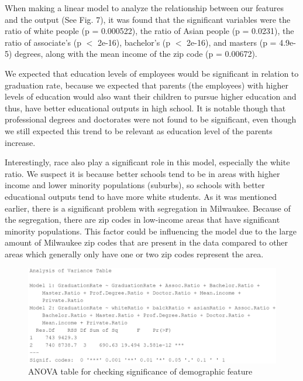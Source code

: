 \documentclass[letterpaper, 10 pt, conference]{ieeeconf}  %
\begin{document}
When making a linear model to analyze the relationship between our features and the output (See Fig. 7), it was found that the significant variables were the ratio of white people (p = 0.000522), the ratio of Asian people (p = 0.0231), the ratio of associate's (p $<$ 2e-16), bachelor's (p $<$ 2e-16), and masters (p = 4.9e-5) degrees, along with the mean income of the zip code (p = 0.00672). 

We expected that education levels of employees would be significant in relation to graduation rate, because we expected that parents (the employees) with higher levels of education would also want their children to pursue higher education and thus, have better educational outputs in high school. 
It is notable though that professional degrees and doctorates were not found to be significant, even though we still expected this trend to be relevant as education level of the parents increase. 

Interestingly, race also play a significant role in this model, especially the white ratio.
We suspect it is because better schools tend to be in areas with higher income and lower minority populations (suburbs), so schools with better educational outputs tend to have more white students.
As it was mentioned earlier, there is a significant problem with segregation in Milwaukee. Because of the segregation, there are zip codes in low-income areas that have significant minority populations. 
This factor could be influencing the model due to the large amount of Milwaukee zip codes that are present in the data compared to other areas which generally only have one or two zip codes represent the area. 

\begin{figure}[h]
\begin{center}
\includegraphics[width=1.0\linewidth]{ANOVA_Grad.PNG}
\end{center}
\caption{ANOVA table for checking significance of demographic feature}
\label{fig:long}
\label{fig:onecol}
\end{figure}
\end{document}
